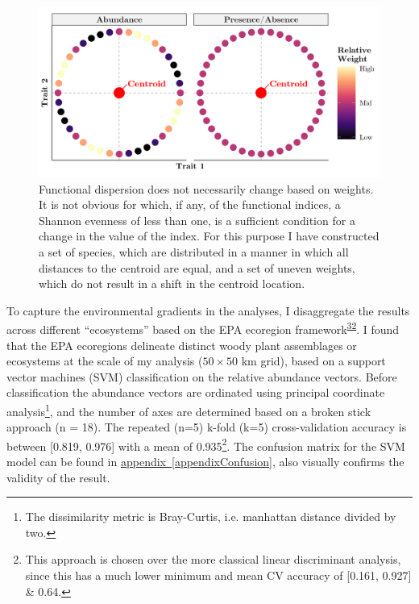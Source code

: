 \documentclass[
  10pt,
]{article}
\newcommand{\aref}[1]{\hyperref[#1]{appendix~\ref*{#1}}}
\begin{document}
\begin{figure}
  \vspace{-0.6cm}
  \includegraphics[width=\linewidth]{../Final Visualizations/exampleNoChangeFDis.png}
  \caption{Functional dispersion does not necessarily change based on weights. It is not obvious for which, if any, of the functional indices, a Shannon evenness of less than one, is a sufficient condition for a change in the value of the index. For this purpose I have constructed a set of species, which are distributed in a manner in which all distances to the centroid are equal, and a set of uneven weights, which do not result in a shift in the centroid location.}
  \label{fig:counterExample}
  \vspace{.35cm}
\end{figure}

To capture the environmental gradients in the analyses, I disaggregate the results across different ``ecosystems'' based on the EPA ecoregion framework\textsuperscript{\protect\hyperlink{ref-EPAecoregions}{32}}. I found that the EPA ecoregions delineate distinct woody plant assemblages or ecosystems at the scale of my analysis (\(50\times50\) km grid), based on a support vector machines (SVM) classification on the relative abundance vectors. Before classification the abundance vectors are ordinated using principal coordinate analysis\footnote{The dissimilarity metric is Bray-Curtis, i.e. manhattan distance divided by two.}, and the number of axes are determined based on a broken stick approach (n = 18). The repeated (n=5) k-fold (k=5) cross-validation accuracy is between {[}0.819, 0.976{]} with a mean of 0.935\footnote{This approach is chosen over the more classical linear discriminant analysis, since this has a much lower minimum and mean CV accuracy of [0.161, 0.927] \& 0.64.}. The confusion matrix for the SVM model can be found in \aref{appendixConfusion}, also visually confirms the validity of the result.
\end{document}
